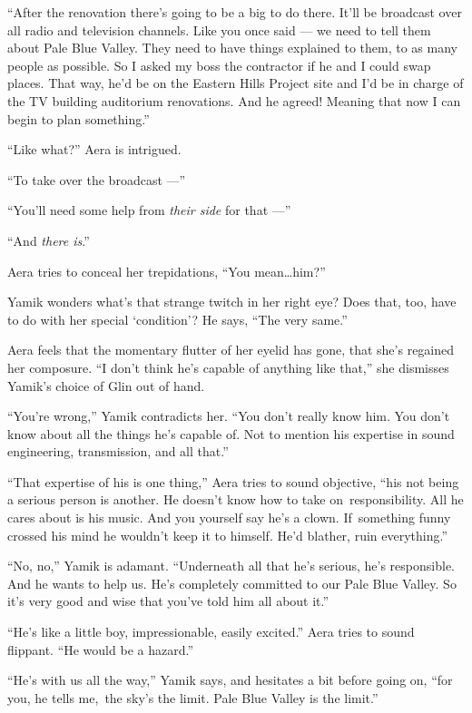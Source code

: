 \documentclass[twoside,11pt]{book}
\begin{document}
``After the renovation there's going to be a big to do there. It'll be broadcast over all radio and
television channels. Like you once said --- we need to tell them about Pale Blue Valley. They need to have things
explained to them, to as many people as possible.  So I asked my boss the contractor if he and I could swap places.
That way, he'd be on the Eastern Hills Project site and I'd be in charge of the TV building auditorium renovations. And
he agreed!  Meaning that now I can begin to plan something.''

``Like what?'' Aera is intrigued.

``To take over the broadcast ---''

``You'll need some help from \textit{their side }for that ---''

``And \textit{there is}.''

Aera tries to conceal her trepidations, ``You mean{\ldots}him?''

Yamik wonders what's that strange twitch in her right eye? Does that, too, have to do with her special `condition'? He
says, ``The very same.''

Aera feels that the momentary flutter of her eyelid has gone, that she's regained her composure. ``I don't
think he's capable of anything like that,'' she dismisses Yamik's choice of Glin out of hand.

``You're wrong,'' Yamik contradicts her. ``You don't really know him. You don't
know about all the things he's capable of. Not to mention his expertise in sound engineering, transmission, and all
that.''

``That expertise of his is one thing,'' Aera tries to sound objective, ``his not
being a serious person is another.  He doesn't know how to take on~responsibility. All he cares about is his music.
And you yourself say he's a clown. If~something funny crossed his mind he wouldn't keep it to himself. He'd blather,
ruin everything.''

``No, no,'' Yamik is adamant. ``Underneath all that he's serious, he's
responsible. And he wants to help us. He's completely committed to our Pale Blue Valley. So it's very good and wise
that you've told him all about it.''

``He's like a little boy, impressionable, easily excited.'' Aera tries to sound flippant.
``He would be a hazard.''

``He's with us all the way,'' Yamik says, and hesitates a bit before going
on,{ }``for you, he tells me,~the sky's the limit. Pale Blue Valley is the limit.''
\end{document}
